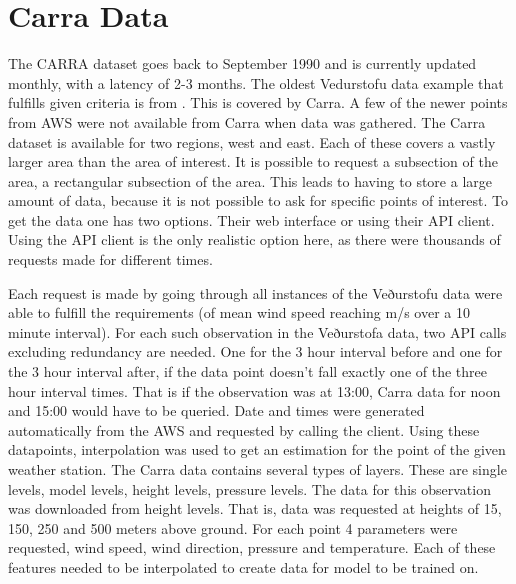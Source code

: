 \section{Carra Data}
The CARRA dataset goes back to September 1990 and is currently updated monthly, with a latency of 2-3 months. The oldest Vedurstofu data example that fulfills given criteria is from \startDateVedur. This is covered by Carra. A few of the newer points from AWS were not available from Carra when data was gathered. The Carra dataset is available for two regions, west and east. Each of these covers a vastly larger area than the area of interest. It is possible to request a subsection of the area, a rectangular subsection of the area. This leads to having to store a large amount of data, because it is not possible to ask for specific points of interest. To get the data one has two options. Their web interface or using their API client. Using the API client is the only realistic option here, as there were thousands of requests made for different times.

Each request is made by going through all instances of the Veðurstofu data were able to fulfill the requirements (of mean wind speed reaching \averageWindSpeedLimit m/s over a 10 minute interval). For each such observation in the Veðurstofa data, two API calls excluding redundancy are needed. One for the 3 hour interval before and one for the 3 hour interval after, if the data point doesn't fall exactly one of the three hour interval times. That is if the observation was at 13:00, Carra data for noon and 15:00 would have to be queried. Date and times were generated automatically from the AWS and requested by calling the client. Using these datapoints, interpolation was used to get an estimation for the point of the given weather station. The Carra data contains several types of layers. These are single levels, model levels, height levels, pressure levels. The data for this observation was downloaded from height levels. That is, data was requested at heights of 15, 150, 250 and 500 meters above ground. For each point 4 parameters were requested, wind speed, wind direction, pressure and temperature. Each of these features needed to be interpolated to create data for model to be trained on.

